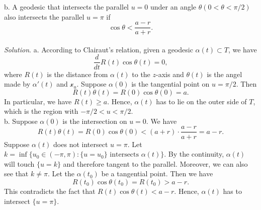 \documentclass[12pt]{article}
\begin{document}
b. A geodesic that intersects the parallel $u = 0$ under an angle $\theta (0< \theta < \pi/2)$ also intersects the parallel $u = \pi$ if \begin{equation*}
    \cos \theta < \frac{a-r}{a+r}.
\end{equation*}\\

\textit{Solution}. 
a. According to Clairaut's relation, given a geodesic $\alpha(t)\subset T$, we have \begin{equation*}
    \frac{d}{dt} R(t)\cos\theta(t) = 0,
\end{equation*}
where $R(t)$ is the distance from $\alpha(t)$ to the $z$-axis and $\theta(t)$ is the angel made by $\alpha'(t)$ and $\mathcal{x}_u$. Suppose $\alpha(0)$ is the tangential point on $u = \pi/2$. Then \begin{equation*}
    R(t)\theta(t) = R(0)\cos\theta(0)= a.
\end{equation*}
In particular, we have $R(t)\geq a$. Hence, $\alpha(t)$ has to lie on the outer side of $T$, which is the region with $-\pi/2<u<\pi/2$.\\

b. Suppose $\alpha(0)$ is the intersection on $u = 0$. We have  \begin{equation*}
    R(t)\theta(t) = R(0)\cos\theta(0) < (a+r)\cdot \frac{a-r}{a+r} = a-r.
\end{equation*}
Suppose $\alpha(t)$ does not intersect $u=\pi$. Let $k = \inf\{u_0\in (-\pi,\pi):\text{$\{u=u_0\}$ intersects $\alpha(t)$}\}$. By the continuity, $\alpha(t)$ will touch $\{u=k\}$ and therefore tangent to the parallel. Moreover, we can also see that $k\neq \pi$. Let the $\alpha(t_0)$ be a tangential point. Then we have \begin{equation*}
    R(t_0)\cos\theta(t_0) = R(t_0) > a - r.
\end{equation*}
This contradicts the fact that $R(t)\cos\theta(t) < a-r$. Hence, 
$\alpha(t)$ has to intersect $\{u=\pi\}$.
\end{document}
